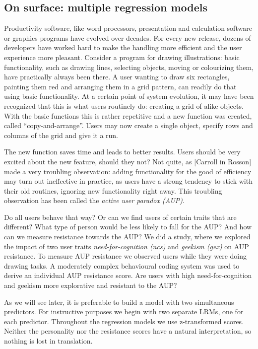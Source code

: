 \documentclass[]{svmono}
\begin{document}
\subsection{On surface: multiple regression
models}\label{on-surface-multiple-regression-models}

Productivity software, like word processors, presentation and
calculation software or graphics programs have evolved over decades. For
every new release, dozens of developers have worked hard to make the
handling more efficient and the user experience more pleasant. Consider
a program for drawing illustrations: basic functionality, such as
drawing lines, selecting objects, moving or colourizing them, have
practically always been there. A user wanting to draw six rectangles,
painting them red and arranging them in a grid pattern, can readily do
that using basic functionality. At a certain point of system evolution,
it may have been recognized that this is what users routinely do:
creating a grid of alike objects. With the basic functions this is
rather repetitive and a new function was created, called
``copy-and-arrange''. Users may now create a single object, specify rows
and columns of the grid and give it a run.

The new function saves time and leads to better results. Users should be
very excited about the new feature, should they not? Not quite, as
{[}Carroll in Rosson{]} made a very troubling observation: adding
functionality for the good of efficiency may turn out ineffective in
practice, as users have a strong tendency to stick with their old
routines, ignoring new functionality right away. This troubling
observation has been called the \emph{active user paradox (AUP)}.

Do all users behave that way? Or can we find users of certain traits
that are different? What type of person would be less likely to fall for
the AUP? And how can we measure resistance towards the AUP? We did a
study, where we explored the impact of two user traits
\emph{need-for-cognition (ncs)} and \emph{geekism (gex)} on AUP
resistance. To measure AUP resistance we observed users while they were
doing drawing tasks. A moderately complex behavioural coding system was
used to derive an individual AUP resistance score. Are users with high
need-for-cognition and geekism more explorative and resistant to the
AUP?

As we will see later, it is preferable to build a model with two
simultaneous predictors. For instructive purposes we begin with two
separate LRMs, one for each predictor. Throughout the regression models
we use z-transformed scores. Neither the personality nor the resistance
scores have a natural interpretation, so nothing is lost in translation.
\end{document}
